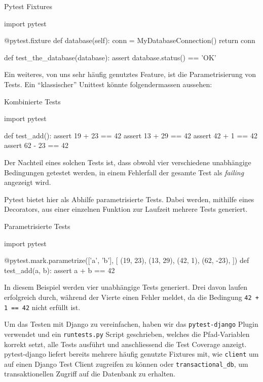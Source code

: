 \begin{listing}
\caption{Pytest Fixtures}
\label{improvements:pytest-fixtures}
\begin{pythoncode}
import pytest

@pytest.fixture
def database(self):
    conn = MyDatabaseConnection()
    return conn

def test_the_database(database):
    assert database.status() == 'OK'
\end{pythoncode}
\end{listing}

Ein weiteres, von uns sehr häufig genutztes Feature, ist die Parametrisierung von
Tests. Ein \enquote{klassischer} Unittest könnte folgendermassen aussehen:

\begin{listing}
\caption{Kombinierte Tests}
\label{improvements:pytest-combined}
\begin{pythoncode}
import pytest

def test_add():
    assert 19 + 23 == 42
    assert 13 + 29 == 42
    assert 42 + 1 == 42
    assert 62 - 23 == 42
\end{pythoncode}
\end{listing}

Der Nachteil eines solchen Tests ist, dass obwohl vier verschiedene unabhängige
Bedingungen getestet werden, in einem Fehlerfall der gesamte Test als
\textit{failing} angezeigt wird.

Pytest bietet hier als Abhilfe parametrisierte Tests. Dabei werden, mithilfe eines
Decorators, aus einer einzelnen Funktion zur Laufzeit mehrere Tests generiert.

\begin{listing}
\caption{Parametrisierte Tests}
\label{improvements:pytest-parametrize}
\begin{pythoncode}
import pytest

@pytest.mark.parametrize(['a', 'b'], [
	(19, 23),
	(13, 29),
	(42, 1),
	(62, -23),
])
def test_add(a, b):
    assert a + b == 42
\end{pythoncode}
\end{listing}

In diesem Beispiel werden vier unabhängige Tests generiert. Drei davon laufen
erfolgreich durch, während der Vierte einen Fehler meldet, da die Bedingung
\texttt{42 + 1 == 42} nicht erfüllt ist.

Um das Testen mit Django zu vereinfachen, haben wir das \texttt{pytest-django}
Plugin verwendet und ein \texttt{runtests.py} Script geschrieben, welches die
Pfad-Variablen korrekt setzt, alle Tests ausführt und anschliessend die Test
Coverage anzeigt. pytest-django liefert bereits mehrere häufig genutzte Fixtures
mit, wie \zb \texttt{client} um auf einen Django Test Client zugreifen zu können
oder \texttt{transactional\_db}, um transaktionellen Zugriff auf die Datenbank
zu erhalten.

